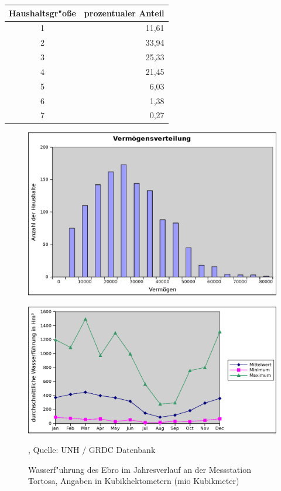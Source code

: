 \documentclass[11pt,a4paper]{article}
\begin{document}
\begin{tabular}[h]{|c|r|}
\hline Haushaltsgr"oße & prozentualer Anteil \\ 
\hline 1 & 11,61 \\ 
\hline 2 & 33,94 \\ 
\hline 3 & 25,33 \\ 
\hline 4 & 21,45 \\ 
\hline 5 & 6,03 \\ 
\hline 6 & 1,38 \\ 
\hline 7 & 0,27 \\ 
\hline 
\end{tabular} 

\begin{figure}[htbp]
\centering
\includegraphics[width=\textwidth]{./wealth-distribution}
\caption{}
\label{fig:wealth-distribution}
\end{figure}

\begin{figure}[h]
\centering
\includegraphics[width=\textwidth]{./ebro-wasser}
\caption{Wasserf"uhrung des Ebro im Jahresverlauf an der Messstation Tortosa, Angaben in Kubikhektometern (mio Kubikmeter)}, Quelle: UNH / GRDC Datenbank
\label{fig:ebro-water}
\end{figure}
\end{document}
